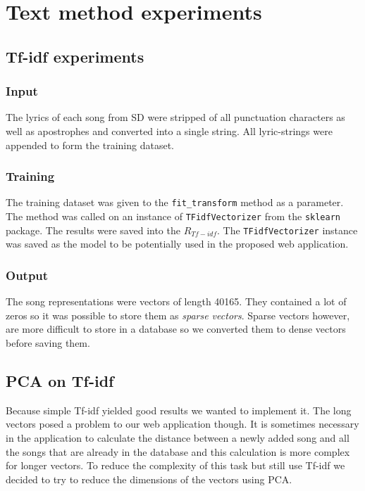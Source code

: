 \section{Text method experiments}\label{sec:text_experiments}

\subsection{Tf-idf experiments}\label{ssec:TF_idf_experiments}

\subsubsection{Input}
The lyrics of each song from SD were stripped of all punctuation characters as well as apostrophes and converted into a single string. All lyric-strings were appended to form the training dataset.
\subsubsection{Training}
The training dataset was given to the \texttt{fit\_transform} method as a parameter. The method was called on an instance of \texttt{TFidfVectorizer} from the \texttt{sklearn} package. The results were saved into the $R_{Tf-idf}$. The \texttt{TFidfVectorizer} instance was saved as the model to be potentially used in the proposed web application. 

\subsubsection{Output}
The song representations were vectors of length 40165. They contained a lot of zeros so it was possible to store them as \textit{sparse vectors}. Sparse vectors however, are more difficult to store in a database so we converted them to dense vectors before saving them.

\subsection{PCA on Tf-idf}\label{ssec:PCA_on_tf_idf_experiments}

Because simple Tf-idf yielded good results we wanted to implement it. The long vectors posed a problem to our web application though. It is sometimes necessary in the application to calculate the distance between a newly added song and all the songs that are already in the database and this calculation is more complex for longer vectors. To reduce the complexity of this task but still use Tf-idf we decided to try to reduce the dimensions of the vectors using PCA.

